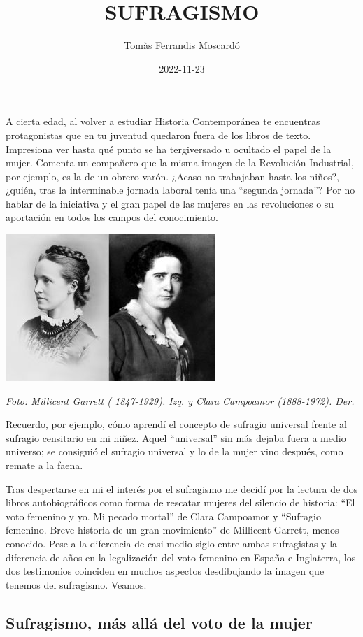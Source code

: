 \documentclass[
]{article}
\title{SUFRAGISMO}
\author{Tomàs Ferrandis Moscardó}
\date{2022-11-23}
\begin{document}
\maketitle

{
\setcounter{tocdepth}{2}
\tableofcontents
}
A cierta edad, al volver a estudiar Historia Contemporánea te encuentras
protagonistas que en tu juventud quedaron fuera de los libros de texto.
Impresiona ver hasta qué punto se ha tergiversado u ocultado el papel de
la mujer. Comenta un compañero que la misma imagen de la Revolución
Industrial, por ejemplo, es la de un obrero varón. ¿Acaso no trabajaban
hasta los niños?, ¿quién, tras la interminable jornada laboral tenía una
``segunda jornada''? Por no hablar de la iniciativa y el gran papel de
las mujeres en las revoluciones o su aportación en todos los campos del
conocimiento.

\includegraphics{png/Clara_Campoamor-y-Millicent_Garret.jpg}

\emph{Foto: Millicent Garrett ( 1847-1929). Izq. y Clara Campoamor
(1888-1972). Der.}

Recuerdo, por ejemplo, cómo aprendí el concepto de sufragio universal
frente al sufragio censitario en mi niñez. Aquel ``universal'' sin más
dejaba fuera a medio universo; se consiguió el sufragio universal y lo
de la mujer vino después, como remate a la faena.

Tras despertarse en mi el interés por el sufragismo me decidí por la
lectura de dos libros autobiográficos como forma de rescatar mujeres del
silencio de historia: ``El voto femenino y yo. Mi pecado mortal'' de
Clara Campoamor y ``Sufragio femenino. Breve historia de un gran
movimiento'' de Millicent Garrett, menos conocido. Pese a la diferencia
de casi medio siglo entre ambas sufragistas y la diferencia de años en
la legalización del voto femenino en España e Inglaterra, los dos
testimonios coinciden en muchos aspectos desdibujando la imagen que
tenemos del sufragismo. Veamos.

\hypertarget{sufragismo-muxe1s-alluxe1-del-voto-de-la-mujer}{%
\subsection{Sufragismo, más allá del voto de la
mujer}\label{sufragismo-muxe1s-alluxe1-del-voto-de-la-mujer}}
\end{document}
